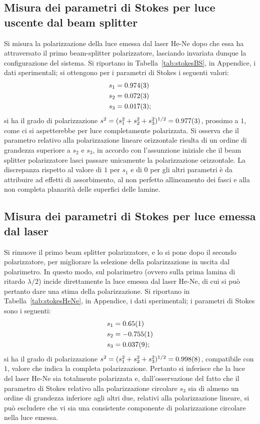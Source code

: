\documentclass[10pt,oneside,a4paper]{article}
\begin{document}
\begin{multicols}{2}
\subsection{Misura dei parametri di Stokes per luce uscente dal beam splitter}
Si misura la polarizzazione della luce emessa dal laser He-Ne dopo che essa ha attraversato il primo beam-splitter polarizzatore, lasciando invariata dunque la configurazione del sistema. Si riportano in Tabella~\ref{tab:stokesBS}, in Appendice, i dati sperimentali; si ottengono per i parametri di Stokes i seguenti valori:
\[
\begin{aligned}
s_1 &= \SI{0.974 \pm 0.003}{} \\
s_2 &= \SI{0.072 \pm 0.003}{}\\
s_3 &= \SI{0.017 \pm 0.003}{};\\
\end{aligned}
\]
si ha il grado di polarizzazione $s^2 = (s_1^2+s_2^2+s_3^2)^{1/2} = \SI{0.977 \pm 0.003}{}$, prossimo a $1$, come ci si aspetterebbe per luce completamente polarizzata. Si osserva che il parametro relativo alla polarizzazione lineare orizzontale risulta di un ordine di grandezza superiore a $s_2$ e $s_3$, in accordo con l'assunzione iniziale che il beam splitter polarizzatore lasci passare unicamente la polarizzazione orizzontale. La discrepanza rispetto al valore di $1$ per $s_1$ e di $0$ per gli altri parametri è da attribuire ad effetti di assorbimento, al non perfetto allineamento dei fasci e alla non completa planarità delle superfici delle lamine.

\subsection{Misura dei parametri di Stokes per luce emessa dal laser}
Si rimuove il primo beam splitter polarizzatore, e lo si pone dopo il secondo polarizzatore, per migliorare la selezione della polarizzazione in uscita dal polarimetro. In questo modo, sul polarimetro (ovvero sulla prima lamina di ritardo $\lambda / 2$) incide direttamente la luce emessa dal laser He-Ne, di cui si può pertanto dare una stima della polarizzazione. Si riportano in Tabella~\ref{tab:stokesHeNe}, in Appendice, i dati sperimentali; i parametri di Stokes sono i seguenti:
\[
\begin{aligned}
s_1 &= \SI{0.65 \pm 0.01}{} \\
s_2 &= \SI{-0.755 \pm 0.001}{}\\
s_3 &= \SI{0.037 \pm 0.009}{};\\
\end{aligned}
\]
si ha il grado di polarizzazione $s^2 = (s_1^2+s_2^2+s_3^2)^{1/2} = \SI{0.998 \pm 0.008}{}$, compatibile con $1$, valore che indica la completa polarizzazione. Pertanto si inferisce che la luce del laser He-Ne sia totalmente polarizzata e, dall'osservazione del fatto che il parametro di Stokes relativo alla polarizzazione circolare $s_3$ sia di almeno un ordine di grandezza inferiore agli altri due, relativi alla polarizzazione lineare, si può escludere che vi sia una consistente componente di polarizzazione circolare nella luce emessa.


\end{multicols}
\end{document}
